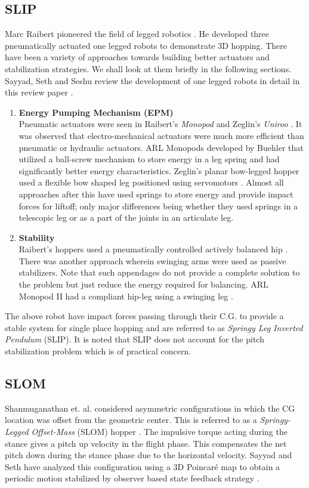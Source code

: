 \subsection*{SLIP}
Marc Raibert pioneered the field of legged robotics \cite{leglab, raibert_book}. He developed three pneumatically actuated one legged robots to demonstrate 3D hopping. There have been a variety of approaches towards building better actuators and stabilization strategies. We shall look at them briefly in the following sections. Sayyad, Seth and Seshu review the development of one legged robots in detail in this review paper \cite{review}.
\begin{enumerate}
 \item \textbf{Energy Pumping Mechanism (EPM)}\\
Pneumatic actuators were seen in Raibert's \emph{Monopod} \cite{raibert_monopod} and Zeglin's \emph{Uniroo} \cite{zeglin}. It was observed that electro-mechanical actuators were much more efficient than pneumatic or hydraulic actuators. 
ARL Monopods developed by Buehler \cite{ARLMono1, ARLMono2} that utilized a ball-screw mechanism to store
energy in a leg spring and had significantly better energy characteristics. Zeglin's planar bow-legged hopper used a flexible bow shaped leg positioned using servomotors \cite{bowleg}. Almost all approaches after this have used springs to store energy and provide impact forces for liftoff; only major differences being whether they used springs in a telescopic leg or as a part of the joints in an articulate leg.
 
  \item \textbf{Stability} \\
  Raibert's hoppers used a pneumatically controlled actively balanced hip \cite{review, ARLMono1}. There was another approach wherein swinging arms were used as passive stabilizers. Note that such appendages do not provide a complete solution to the problem but just reduce the energy required for balancing. ARL Monopod II had a compliant hip-leg using a swinging leg \cite{Bue_PassRun, ARLMono2}.
\end{enumerate}

The above robot have impact forces passing through their C.G. to provide a stable system for single place hopping and are referred to as \emph{Springy Leg Inverted Pendulum} (SLIP). It is noted that SLIP
does not account for the pitch stabilization problem which is of practical concern.

\subsection*{SLOM}
Shanmuganathan et. al. considered asymmetric configurations in which the CG location was offset 
from the geometric center. This is referred to as a \emph{Springy-Legged Offset-Mass} (SLOM) hopper \cite{shanmug}. The impulsive torque acting during the stance gives a pitch up velocity in the flight phase. This compensates the net pitch down during the stance phase due to the horizontal velocity. Sayyad and Seth have analyzed this configuration using a 3D Poincar\'e map to obtain a periodic motion stabilized by observer based state feedback strategy \cite{sayyad}.

